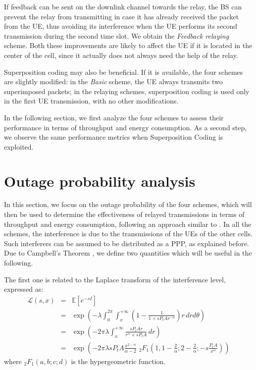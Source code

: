 \documentclass[12pt, letterpaper, onecolumn, draftcls]{IEEEtran}
\begin{document}
If feedback can be sent on the downlink channel towards the relay, the BS can prevent the relay from transmitting in case it has already received the packet from the UE, thus avoiding its interference when the UE performs its second transmission during the second time slot. We obtain the \textit{Feedback relaying} scheme.
Both these improvements are likely to affect the UE if it is located in the center of the cell, since it actually does not always need the help of the relay.

Superposition coding may also be beneficial. If it is available, the four schemes are slightly modified: in the \textit{Basic} scheme, the UE always transmits two superimposed packets; in the relaying schemes, superposition coding is used only in the first UE transmission, with no other modifications.

In the following section, we first analyze the four schemes to assess their performance in terms of throughput and energy consumption. As a second step, we observe the same performance metrics when Superposition Coding is exploited.









\section{Outage probability analysis}
\label{out_prob}
In this section, we focus on the outage probability of the four schemes, which will then be used to determine the effectiveness of relayed transmissions in terms of throughput and energy consumption, following an approach similar to \cite{Haenggi, relOFDM}.
In all the schemes, the interference is due to the transmissions of the UEs of the other cells. Such interferers can be assumed to be distributed as a PPP, as explained before. Due to Campbell's Theorem \cite{Mecke}, we define two quantities which will be useful in the following.

The first one is related to the Laplace transform of the interference level, expressed as:
\begin{eqnarray}
 \mathscr{L}(s,x) & = & \mathbb{E}\left[e^{-sI}\right] \nonumber\\
 & = & \exp\left(-\lambda\int_0^{2\pi}\int_x^{+\infty}\left(1-\frac{1}{1+sP_tAr^{-\alpha}}\right)r\,drd\theta\right) \nonumber\\
 & = & \exp\left(-2\pi\lambda\int_x^{+\infty}\frac{sP_tAr}{r^{\alpha}+sP_tA}\,dr\right) \nonumber \\
 & = & \exp\left(-2\pi\lambda sP_tA\frac{x^{2-\alpha}}{\alpha-2}\,\,{}_2F_1\left(1,1-\frac{2}{\alpha};2-\frac{2}{\alpha};-s\frac{P_tA}{x^{\alpha}}\right)\right)
\end{eqnarray}
where ${}_2F_1(a,b;c;d)$ is the hypergeometric function\cite{inte}.
\end{document}
